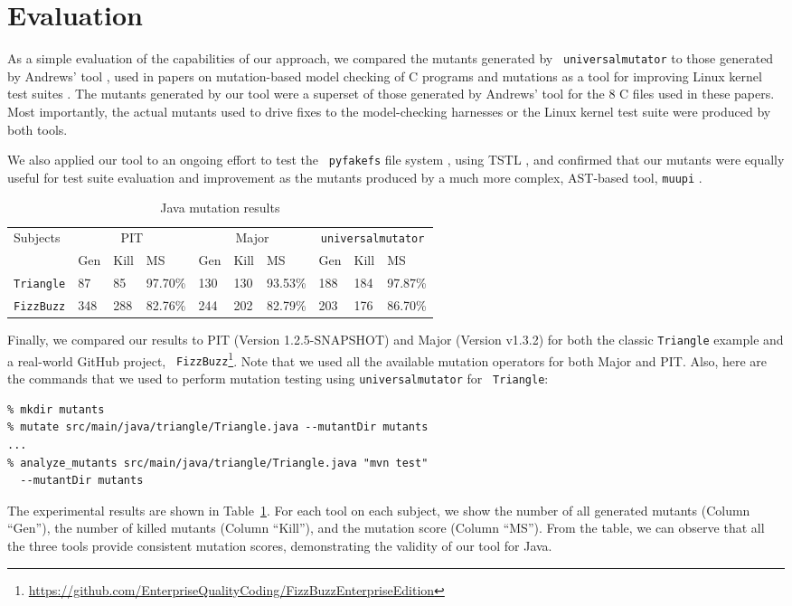 \section{Evaluation}

As a simple evaluation of the capabilities of our approach, we compared the mutants generated by {\tt
  universalmutator} to those generated by Andrews' tool \cite{mutant},
used in papers on mutation-based model checking of C programs
\cite{ASE15} and mutations as a tool for improving Linux kernel test
suites \cite{mutation17}.  The mutants generated by our tool were a
superset of those generated by Andrews' tool for the 8 C files used in
these papers.  Most importantly, the actual mutants used to drive
fixes to the model-checking harnesses or the Linux kernel test suite
were produced by both tools.

We also applied our tool to an ongoing effort to test the {\tt
  pyfakefs} file system \cite{pyfakefs}, using TSTL \cite{nfm15,tstlsttt},
and confirmed that our mutants were equally useful for test suite
evaluation and improvement as the mutants produced by a much more
complex, AST-based tool, {\tt muupi} \cite{muupi}.
\begin{table}[t!]
  \scriptsize
  \caption{\label{tab:java} Java mutation results}
  \begin{tabular}{|l|lll|lll|lll|}
    \hline
    Subjects&\multicolumn{3}{c|}{PIT}&\multicolumn{3}{c|}{Major}&\multicolumn{3}{c|}{{\tt universalmutator}}\\
    &Gen&Kill&MS&Gen&Kill&MS&Gen&Kill&MS\\\hline
\hline
    {\tt Triangle}&87&85&97.70\%&130&130&93.53\%&188&184&97.87\%\\
{\tt FizzBuzz}&348&288&82.76\%&244&202&82.79\%&203&176&86.70\%\\
  \hline\end{tabular}
  \end{table}

Finally, we compared our results to PIT (Version 1.2.5-SNAPSHOT)
\cite{pittest} and Major (Version v1.3.2) \cite{major} for both the
classic {\tt Triangle} example and a real-world GitHub project, {\tt
  FizzBuzz}\footnote{\url{https://github.com/EnterpriseQualityCoding/FizzBuzzEnterpriseEdition}
}.  Note that we used all the available mutation operators for both
Major and PIT. Also, here are the commands that we used to
perform mutation testing using {\tt universalmutator} for {\tt
  Triangle}:
{\scriptsize
\begin{verbatim}
% mkdir mutants
% mutate src/main/java/triangle/Triangle.java --mutantDir mutants
...
% analyze_mutants src/main/java/triangle/Triangle.java "mvn test"
  --mutantDir mutants
\end{verbatim}
} The experimental results are shown in Table~\ref{tab:java}. For each
tool on each subject, we show the number of all generated mutants
(Column ``Gen''), the number of killed mutants (Column ``Kill''), and
the mutation score (Column ``MS''). From the table, we can observe that all the three tools provide consistent mutation scores, demonstrating the validity of our tool for Java.

